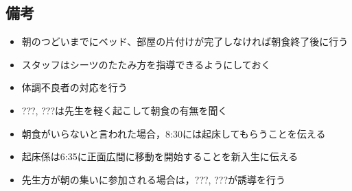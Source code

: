 \subsection{備考}
\begin{itemize}
\item 朝のつどいまでにベッド、部屋の片付けが完了しなければ朝食終了後に行う
\item スタッフはシーツのたたみ方を指導できるようにしておく
\item 体調不良者の対応を行う
\item ???, ???は先生を軽く起こして朝食の有無を聞く
\item 朝食がいらないと言われた場合，8:30には起床してもらうことを伝える
\item 起床係は6:35に正面広間に移動を開始することを新入生に伝える
\item 先生方が朝の集いに参加される場合は，???, ???が誘導を行う
\end{itemize}

%
